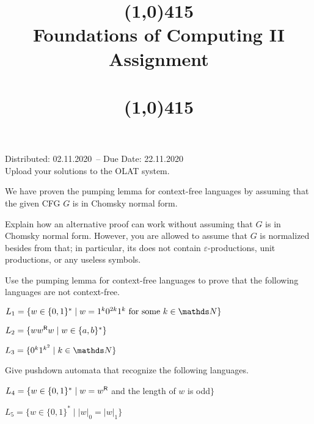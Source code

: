 \documentclass{exercise}
\title{\line(1,0){415}\\
  Foundations of Computing II\\
  \Large Assignment \theexercise\\[1em]
  \large{\topics}\\
  \line(1,0){415}}
\newcommand{\distdate}{02.11.2020}
\newcommand{\duedate}{22.11.2020}
\begin{document}
\maketitle

\begin{center}
  Distributed: \distdate\ -- Due Date: \duedate\\[1em]
  Upload your solutions to the OLAT system.\\[3em]
\end{center}


We have proven the pumping lemma for context-free languages by assuming that the
given CFG $G$ is in Chomsky normal form.

Explain how an alternative proof can work without assuming that $G$ is in
Chomsky normal form.  However, you are allowed to assume that $G$ is normalized
besides from that; in particular, its does not contain $\varepsilon$-productions,
unit productions, or any useless symbols.



Use the pumping lemma for context-free languages to prove that the following languages
are not context-free.

\subtask $L_1=\{w\in\{0,1\}^*\mid w=1^k0^{2k}1^k \text{ for some } k\in\nat\}$


\subtask $L_2=\{ww^{\textsf{R}}w \mid w\in\{a,b\}^*\}$


\subtask $L_3=\{0^k1^{k^2} \mid k\in\nat\}$
  


Give pushdown automata that recognize the following languages.

\subtask $L_4 = \{w \in \{0,1\}^* \mid w = w^{\textsf{R}}$ and the length of $w$ is odd$\}$


\subtask $L_5 = \{w \in \{0,1\}^* \mid |w|_0=|w|_1\}$
  
\end{document}
